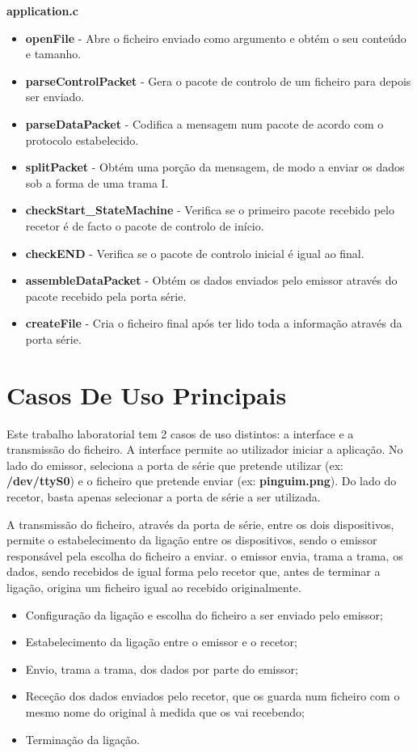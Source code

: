 \documentclass[11pt]{article}
\begin{document}
\textbf{application.c}
\begin{itemize}
	\item \textbf{openFile} - Abre o ficheiro enviado como argumento e obtém o seu conteúdo e tamanho.
	\item \textbf{parseControlPacket} -  Gera o pacote de controlo de um ficheiro para depois ser enviado.
	\item \textbf{parseDataPacket} - Codifica a mensagem num pacote de acordo com o protocolo estabelecido.
	\item \textbf{splitPacket} - Obtém uma porção da mensagem, de modo a enviar os dados sob a forma de uma trama I.
	\item \textbf{checkStart\_StateMachine} - Verifica se o primeiro pacote recebido pelo recetor é de facto o pacote de controlo de início.
	\item \textbf{checkEND} - Verifica se o pacote de controlo inicial é igual ao final.
	\item \textbf{assembleDataPacket} - Obtém os dados enviados pelo emissor através do pacote recebido pela porta série.
	\item \textbf{createFile} - Cria o ficheiro final após ter lido toda a informação através da porta série.

\end{itemize}


\section{Casos De Uso Principais}

Este trabalho laboratorial tem 2 casos de uso distintos: a interface e a transmissão do ficheiro.
A interface permite ao utilizador iniciar a aplicação. No lado do emissor, seleciona a porta de série que pretende utilizar (ex: \textbf{/dev/ttyS0}) e o ficheiro que pretende enviar (ex: \textbf{pinguim.png}). Do lado do recetor, basta apenas selecionar a porta de série a ser utilizada.

A transmissão do ficheiro, através da porta de série, entre os dois dispositivos, permite o estabelecimento da ligação entre os dispositivos, sendo o emissor responsável pela escolha do ficheiro a enviar. o emissor envia, trama a trama, os dados, sendo recebidos de igual forma pelo recetor que, antes de terminar a ligação, origina um ficheiro igual ao recebido originalmente.

\begin{itemize}
	\item Configuração da ligação e escolha do ficheiro a ser enviado pelo emissor;
	\item Estabelecimento da ligação entre o emissor e o recetor;
	\item Envio, trama a trama, dos dados por parte do emissor;
	\item Receção dos dados enviados pelo recetor, que os guarda num ficheiro com o mesmo nome do original à medida que os vai recebendo;
	\item Terminação da ligação.

\end{itemize}
\end{document}
